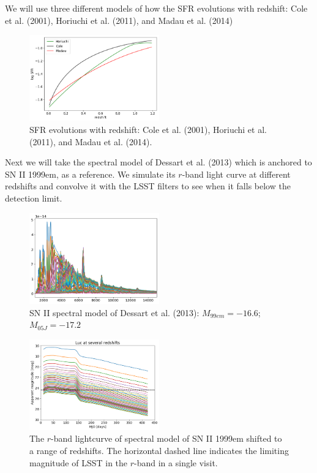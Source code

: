 \documentclass[12pt, onecolumn]{emulateapj}
\begin{document}
We will use three different models of how the SFR evolutions with redshift: Cole et al. (2001), Horiuchi et al. (2011), and Madau et al. (2014)

\begin{figure}
	\begin{center}
		\includegraphics[width=0.5\textwidth]{SNII_SFR.png}
		\caption{SFR evolutions with redshift: Cole et al. (2001), Horiuchi et al. (2011), and Madau et al. (2014).}
		\label{fig:SNII_SFR}
	\end{center}
\end{figure}

Next we will take the spectral model of Dessart et al. (2013) which is anchored to SN II 1999em, as a reference. We simulate its $r$-band light curve at different redshifts and convolve it with the LSST filters to see when it falls below the detection limit.

\begin{figure}
	\begin{center}
		\includegraphics[width=0.5\textwidth]{spectral_model_SNII.png}
		\caption{SN II spectral model of Dessart et al. (2013): $M_{99em}=-16.6$; $M_{05J}=-17.2$}
		\label{fig:SNII_lc}
	\end{center}
\end{figure}

\begin{figure}
	\begin{center}
		\includegraphics[width=0.5\textwidth]{SNII_lc_withz.png}
		\caption{The $r$-band lightcurve of spectral model of SN II 1999em shifted to a range of redshifts. The horizontal dashed line indicates the limiting magnitude of LSST in the $r$-band in a single visit.}
		\label{fig:SNII_lc_wz}
	\end{center}
\end{figure}
\end{document}
